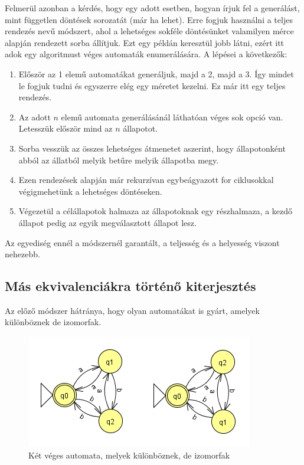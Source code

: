 \documentclass[12pt]{report}
\theoremstyle{definition}
\begin{document}
Felmerül azonban a kérdés, hogy egy adott esetben, hogyan írjuk fel a generálást, mint független döntések sorozatát (már ha lehet). Erre fogjuk használni a teljes rendezés nevű módszert, ahol a lehetséges sokféle döntésünket valamilyen mérce alapján rendezett sorba állítjuk. Ezt egy példán keresztül jobb látni, ezért itt adok egy algoritmust véges automaták enumerálására. A lépései a következők:

\begin{enumerate}
\item Először az 1 elemű automatákat generáljuk, majd a 2, majd a 3. Így mindet le fogjuk tudni és egyszerre elég egy méretet kezelni. Ez már itt egy teljes rendezés.
\item Az adott $n$ elemű automata generálásánál láthatóan véges sok opció van. Letesszük először mind az $n$ állapotot.
\item Sorba vesszük az összes lehetséges átmenetet aszerint, hogy állapotonként abból az állatból melyik betűre melyik állapotba megy.
\item Ezen rendezések alapján már rekurzívan egybeágyazott for ciklusokkal végigmehetünk a lehetséges döntéseken.
\item Végezetül a célállapotok halmaza az állapotoknak egy részhalmaza, a kezdő állapot pedig az egyik megválasztott állapot lesz.
\end{enumerate}

Az egyediség ennél a módszernél garantált, a teljesség és a helyesség viszont nehezebb.

\subsection{Más ekvivalenciákra történő kiterjesztés}
Az előző módszer hátránya, hogy olyan automatákat is gyárt, amelyek különböznek de izomorfak.

\begin{figure}[H]
\centering
\includegraphics[scale=1]{equiv.png}
\caption{\label{izomorf} Két véges automata, melyek különböznek, de izomorfak}
\end{figure}
\end{document}
